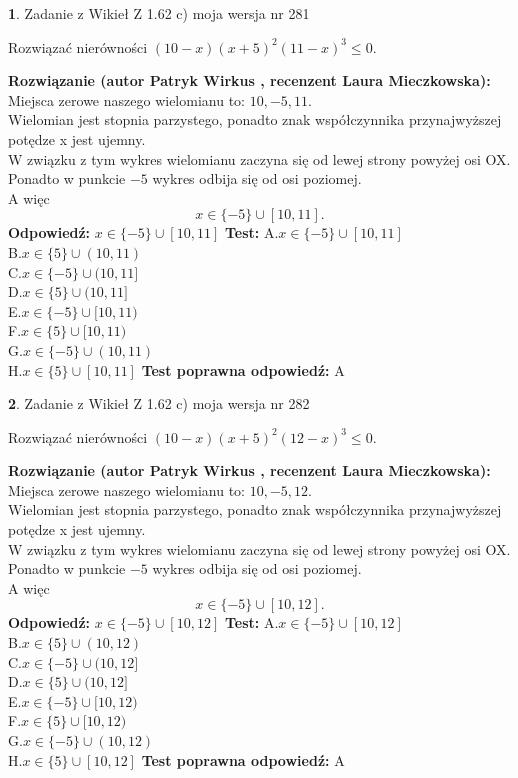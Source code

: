 \documentclass[12pt, a4paper]{article}
\theoremstyle{definition} %
\newtheorem{zad}{}
\newcommand{\zadStart}[1]{\begin{zad}#1\newline}
\newcommand{\zadStop}{\end{zad}}
\newcommand{\rozwStart}[2]{\noindent \textbf{Rozwiązanie (autor #1 , recenzent #2): }\newline}
\newcommand{\rozwStop}{\newline}
\newcommand{\odpStart}{\noindent \textbf{Odpowiedź:}\newline}
\newcommand{\odpStop}{\newline}
\newcommand{\testStart}{\noindent \textbf{Test:}\newline}
\newcommand{\testStop}{\newline}
\newcommand{\kluczStart}{\noindent \textbf{Test poprawna odpowiedź:}\newline}
\newcommand{\kluczStop}{\newline}
\begin{document}
\zadStart{Zadanie z Wikieł Z 1.62 c) moja wersja nr 281}

Rozwiązać nierówności $(10-x)(x+5)^{2}(11-x)^{3}\le0$.
\zadStop
\rozwStart{Patryk Wirkus}{Laura Mieczkowska}
Miejsca zerowe naszego wielomianu to: $10, -5, 11$.\\
Wielomian jest stopnia parzystego, ponadto znak współczynnika przy\linebreak najwyższej potędze x jest ujemny.\\ W związku z tym wykres wielomianu zaczyna się od lewej strony powyżej osi OX.\\
Ponadto w punkcie $-5$ wykres odbija się od osi poziomej.\\
A więc $$x \in \{-5\} \cup [10,11].$$
\rozwStop
\odpStart
$x \in \{-5\} \cup [10,11]$
\odpStop
\testStart
A.$x \in \{-5\} \cup [10,11]$\\
B.$x \in \{5\} \cup (10,11)$\\
C.$x \in \{-5\} \cup (10,11]$\\
D.$x \in \{5\} \cup (10,11]$\\
E.$x \in \{-5\} \cup [10,11)$\\
F.$x \in \{5\} \cup [10,11)$\\
G.$x \in \{-5\} \cup (10,11)$\\
H.$x \in \{5\} \cup [10,11]$
\testStop
\kluczStart
A
\kluczStop



\zadStart{Zadanie z Wikieł Z 1.62 c) moja wersja nr 282}

Rozwiązać nierówności $(10-x)(x+5)^{2}(12-x)^{3}\le0$.
\zadStop
\rozwStart{Patryk Wirkus}{Laura Mieczkowska}
Miejsca zerowe naszego wielomianu to: $10, -5, 12$.\\
Wielomian jest stopnia parzystego, ponadto znak współczynnika przy\linebreak najwyższej potędze x jest ujemny.\\ W związku z tym wykres wielomianu zaczyna się od lewej strony powyżej osi OX.\\
Ponadto w punkcie $-5$ wykres odbija się od osi poziomej.\\
A więc $$x \in \{-5\} \cup [10,12].$$
\rozwStop
\odpStart
$x \in \{-5\} \cup [10,12]$
\odpStop
\testStart
A.$x \in \{-5\} \cup [10,12]$\\
B.$x \in \{5\} \cup (10,12)$\\
C.$x \in \{-5\} \cup (10,12]$\\
D.$x \in \{5\} \cup (10,12]$\\
E.$x \in \{-5\} \cup [10,12)$\\
F.$x \in \{5\} \cup [10,12)$\\
G.$x \in \{-5\} \cup (10,12)$\\
H.$x \in \{5\} \cup [10,12]$
\testStop
\kluczStart
A
\kluczStop
\end{document}
